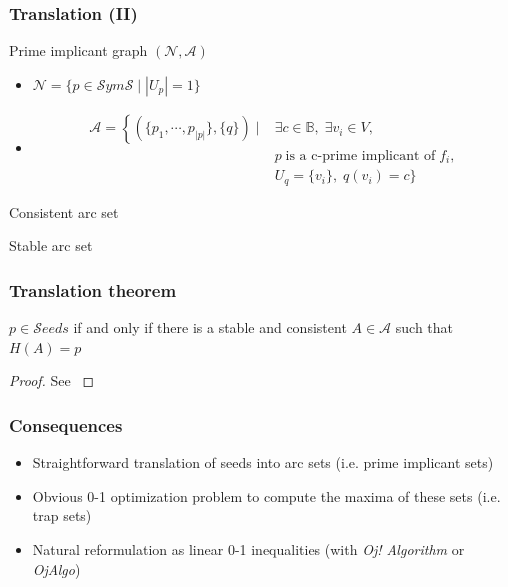 \documentclass{beamer}
\newcommand{\SymS}[0]{\mathcal{S}ym\mathcal{S}}
\newcommand{\Seeds}[0]{\mathcal{S}eeds}
\newcommand{\N}[0]{\mathcal{N}}
\newcommand{\A}[0]{\mathcal{A}}
\begin{document}
\begin{frame}
  \frametitle{Translation (II)}
  \begin{block}{Prime implicant graph $ (\N, \A) $}
    \begin{itemize}
      \item $ \N = \{ p \in \SymS \mid |U_p| = 1 \} $
      \item
        \begin{align*}
          \A = \left\{ \left( \{ p_1, \cdots, p_{|p|} \}, \{ q \} \right) \mid \right. & \exists c \in \mathbb{B}, \; \exists v_i \in V, \\
          & p \; \text{is a c-prime implicant of} \; f_i, \\
          & U_q = \{ v_i \}, \; q(v_i) = c \}
        \end{align*}
    \end{itemize}
  \end{block}
  \begin{block}{Consistent arc set}
  \end{block}
  \begin{block}{Stable arc set}
  \end{block}
\end{frame}

\begin{frame}
  \frametitle{Translation theorem}
  \begin{theorem}
    $ p \in \Seeds $ if and only if there is a stable and consistent $ A \in \mathcal{A} $ such that $ H(A) = p $
  \end{theorem}
  \begin{proof}
    See \cite{Klarner}
  \end{proof}
\end{frame}

\begin{frame}
  \frametitle{Consequences}
  \begin{itemize}
    \item Straightforward translation of seeds into arc sets (i.e. prime implicant sets)
    \item Obvious 0-1 optimization problem to compute the maxima of these sets (i.e. trap sets)
    \item Natural reformulation as linear 0-1 inequalities (with \emph{Oj! Algorithm} or \emph{OjAlgo})
  \end{itemize}
\end{frame}


\end{document}
